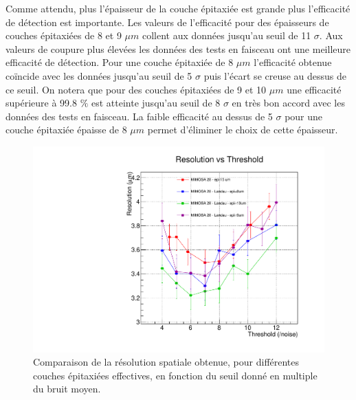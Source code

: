    \medskip
   
   Comme attendu, plus l'\'epaisseur de la couche épitaxiée est grande plus l'efficacit\'e de d\'etection est importante.  Les valeurs de l'efficacité pour des \'epaisseurs de couches épitaxiées de 8 et 9 $\mu m$ collent aux donn\'ees jusqu'au seuil de 11 $\sigma$. Aux valeurs de coupure plus \'elev\'ees les donn\'ees des tests en faisceau ont une meilleure efficacit\'e de d\'etection. Pour une couche épitaxiée de 8 $\mu m$ l'efficacit\'e obtenue coïncide avec les donn\'ees jusqu'au seuil de 5 $\sigma$ puis l'\'ecart se creuse au dessus de ce seuil. On notera que pour des couches épitaxiées de 9 et 10 $\mu m$ une efficacit\'e sup\'erieure \`a 99.8 $\%$ est atteinte jusqu'au seuil de 8 $\sigma$ en tr\`es bon accord avec les donn\'ees des tests en faisceau. La faible efficacit\'e au dessus de 5 $\sigma$ pour une couche épitaxiée \'epaisse de 8 $\mu m$ permet d'\'eliminer le choix de cette \'epaisseur.

   \begin{figure}[!htb]
    \begin{center} 
     \includegraphics[scale=0.49]{./figures/Plots_resultat_simu/G4_landau_comparison_res.pdf}
     \caption{Comparaison de la r\'esolution spatiale obtenue, pour diff\'erentes couches épitaxiées effectives, en fonction du seuil donn\'e en multiple du bruit moyen.}
     \label{fig:comp_landau_res}
   \end{center}
   \end{figure} 
  
  \medskip
  
